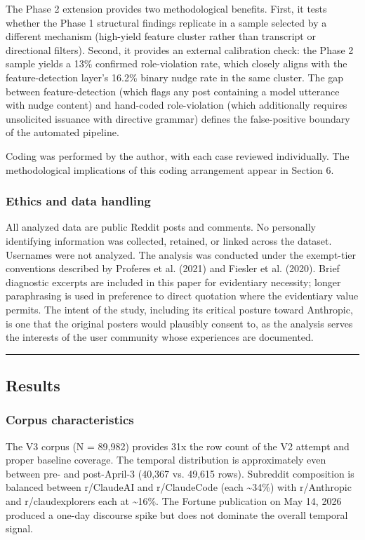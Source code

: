 \documentclass[11pt]{article}
\begin{document}
The Phase 2 extension provides two methodological benefits. First, it tests whether the Phase 1 structural findings replicate in a sample selected by a different mechanism (high-yield feature cluster rather than transcript or directional filters). Second, it provides an external calibration check: the Phase 2 sample yields a 13\% confirmed role-violation rate, which closely aligns with the feature-detection layer's 16.2\% binary nudge rate in the same cluster. The gap between feature-detection (which flags any post containing a model utterance with nudge content) and hand-coded role-violation (which additionally requires unsolicited issuance with directive grammar) defines the false-positive boundary of the automated pipeline.

Coding was performed by the author, with each case reviewed individually. The methodological implications of this coding arrangement appear in Section 6.

\subsubsection{Ethics and data handling}

All analyzed data are public Reddit posts and comments. No personally identifying information was collected, retained, or linked across the dataset. Usernames were not analyzed. The analysis was conducted under the exempt-tier conventions described by Proferes et al. (2021) and Fiesler et al. (2020). Brief diagnostic excerpts are included in this paper for evidentiary necessity; longer paraphrasing is used in preference to direct quotation where the evidentiary value permits. The intent of the study, including its critical posture toward Anthropic, is one that the original posters would plausibly consent to, as the analysis serves the interests of the user community whose experiences are documented.

\bigskip\hrule\bigskip

\subsection{Results}

\subsubsection{Corpus characteristics}

The V3 corpus (N = 89,982) provides 31x the row count of the V2 attempt and proper baseline coverage. The temporal distribution is approximately even between pre- and post-April-3 (40,367 vs. 49,615 rows). Subreddit composition is balanced between r/ClaudeAI and r/ClaudeCode (each \textasciitilde{}34\%) with r/Anthropic and r/claudexplorers each at \textasciitilde{}16\%. The Fortune publication on May 14, 2026 produced a one-day discourse spike but does not dominate the overall temporal signal.
\end{document}
